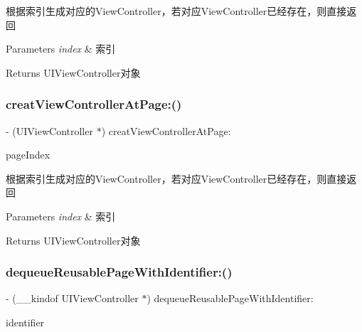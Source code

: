 根据索引生成对应的\+View\+Controller，若对应\+View\+Controller已经存在，则直接返回


\begin{DoxyParams}{Parameters}
{\em index} & 索引\\
\hline
\end{DoxyParams}
\begin{DoxyReturn}{Returns}
U\+I\+View\+Controller对象 
\end{DoxyReturn}
\mbox{\label{interface_v_t_content_view_a40b4f2a5c2a8d8ff7f2ba3ef4e8e9600}} 
\subsubsection{\texorpdfstring{creat\+View\+Controller\+At\+Page\+:()}{creatViewControllerAtPage:()}\hspace{0.1cm}{\footnotesize\ttfamily [3/3]}}
{\footnotesize\ttfamily -\/ (U\+I\+View\+Controller $\ast$) creat\+View\+Controller\+At\+Page\+: \begin{DoxyParamCaption}\item[{(N\+S\+U\+Integer)}]{page\+Index }\end{DoxyParamCaption}}

根据索引生成对应的\+View\+Controller，若对应\+View\+Controller已经存在，则直接返回


\begin{DoxyParams}{Parameters}
{\em index} & 索引\\
\hline
\end{DoxyParams}
\begin{DoxyReturn}{Returns}
U\+I\+View\+Controller对象 
\end{DoxyReturn}
\mbox{\label{interface_v_t_content_view_a81541fa49650eb0f8aa1ddca90798247}} 
\subsubsection{\texorpdfstring{dequeue\+Reusable\+Page\+With\+Identifier\+:()}{dequeueReusablePageWithIdentifier:()}\hspace{0.1cm}{\footnotesize\ttfamily [1/3]}}
{\footnotesize\ttfamily -\/ (\+\_\+\+\_\+kindof U\+I\+View\+Controller $\ast$) dequeue\+Reusable\+Page\+With\+Identifier\+: \begin{DoxyParamCaption}\item[{(N\+S\+String $\ast$)}]{identifier }\end{DoxyParamCaption}}


